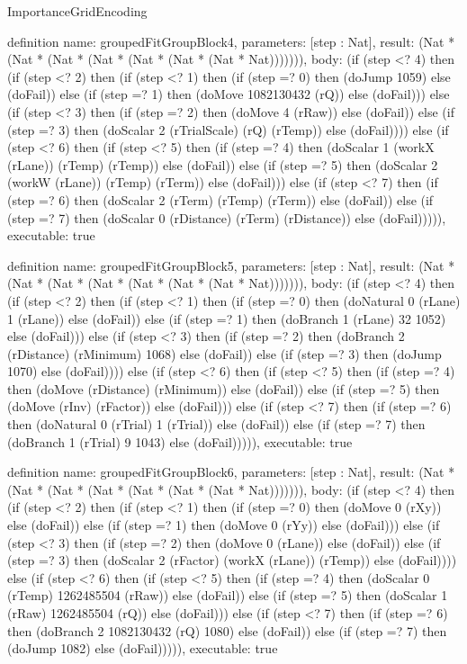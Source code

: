 \begin{lexlean}{ImportanceGridEncoding}
\begin{semanticmodule}
definition{
  name: groupedFitGroupBlock4,
  parameters: [step : Nat],
  result: (Nat * (Nat * (Nat * (Nat * (Nat * (Nat * (Nat * Nat))))))),
  body: (if (step <? 4) then
      (if (step <? 2) then
      (if (step <? 1) then
      (if (step =? 0) then (doJump 1059) else (doFail)) else
      (if (step =? 1) then (doMove 1082130432 (rQ)) else (doFail))) else
      (if (step <? 3) then
      (if (step =? 2) then (doMove 4 (rRaw)) else (doFail)) else
      (if (step =? 3) then (doScalar 2 (rTrialScale) (rQ) (rTemp)) else (doFail)))) else
      (if (step <? 6) then
      (if (step <? 5) then
      (if (step =? 4) then (doScalar 1 (workX (rLane)) (rTemp) (rTemp)) else (doFail)) else
      (if (step =? 5) then (doScalar 2 (workW (rLane)) (rTemp) (rTerm)) else (doFail))) else
      (if (step <? 7) then
      (if (step =? 6) then (doScalar 2 (rTerm) (rTemp) (rTerm)) else (doFail)) else
      (if (step =? 7) then (doScalar 0 (rDistance) (rTerm) (rDistance)) else (doFail))))),
  executable: true
}

definition{
  name: groupedFitGroupBlock5,
  parameters: [step : Nat],
  result: (Nat * (Nat * (Nat * (Nat * (Nat * (Nat * (Nat * Nat))))))),
  body: (if (step <? 4) then
      (if (step <? 2) then
      (if (step <? 1) then
      (if (step =? 0) then (doNatural 0 (rLane) 1 (rLane)) else (doFail)) else
      (if (step =? 1) then (doBranch 1 (rLane) 32 1052) else (doFail))) else
      (if (step <? 3) then
      (if (step =? 2) then (doBranch 2 (rDistance) (rMinimum) 1068) else (doFail)) else
      (if (step =? 3) then (doJump 1070) else (doFail)))) else
      (if (step <? 6) then
      (if (step <? 5) then
      (if (step =? 4) then (doMove (rDistance) (rMinimum)) else (doFail)) else
      (if (step =? 5) then (doMove (rInv) (rFactor)) else (doFail))) else
      (if (step <? 7) then
      (if (step =? 6) then (doNatural 0 (rTrial) 1 (rTrial)) else (doFail)) else
      (if (step =? 7) then (doBranch 1 (rTrial) 9 1043) else (doFail))))),
  executable: true
}

definition{
  name: groupedFitGroupBlock6,
  parameters: [step : Nat],
  result: (Nat * (Nat * (Nat * (Nat * (Nat * (Nat * (Nat * Nat))))))),
  body: (if (step <? 4) then
      (if (step <? 2) then
      (if (step <? 1) then
      (if (step =? 0) then (doMove 0 (rXy)) else (doFail)) else
      (if (step =? 1) then (doMove 0 (rYy)) else (doFail))) else
      (if (step <? 3) then
      (if (step =? 2) then (doMove 0 (rLane)) else (doFail)) else
      (if (step =? 3) then (doScalar 2 (rFactor) (workX (rLane)) (rTemp)) else (doFail)))) else
      (if (step <? 6) then
      (if (step <? 5) then
      (if (step =? 4) then (doScalar 0 (rTemp) 1262485504 (rRaw)) else (doFail)) else
      (if (step =? 5) then (doScalar 1 (rRaw) 1262485504 (rQ)) else (doFail))) else
      (if (step <? 7) then
      (if (step =? 6) then (doBranch 2 1082130432 (rQ) 1080) else (doFail)) else
      (if (step =? 7) then (doJump 1082) else (doFail))))),
  executable: true
}


\end{semanticmodule}
\end{lexlean}
